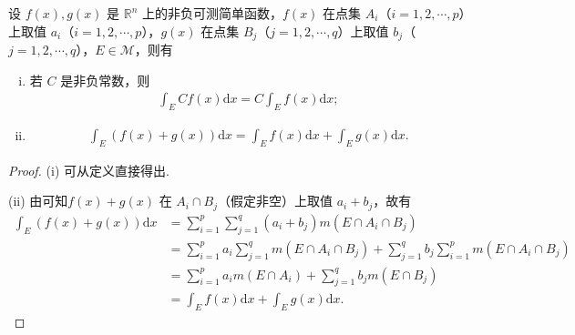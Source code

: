 \documentclass[../../main.tex]{subfiles}%
\begin{document}
\begin{theorem}[积分的线性性质]\label{theorem:简单函数积分的线性性质}
设 \(f(x),g(x)\) 是 \(\mathbb{R}^n\) 上的非负可测简单函数，\(f(x)\) 在点集 \(A_i\)（\(i = 1,2,\cdots,p\)）上取值 \(a_i\)（\(i = 1,2,\cdots,p\)），\(g(x)\) 在点集 \(B_j\)（\(j = 1,2,\cdots,q\)）上取值 \(b_j\)（\(j = 1,2,\cdots,q\)），\(E\in\mathscr{M}\)，则有
\begin{enumerate}[(i)]
\item 若 \(C\) 是非负常数，则
\begin{align*}
\int_{E}Cf(x)\mathrm{d}x = C\int_{E}f(x)\mathrm{d}x;
\end{align*}
\item 
\begin{align*}
\int_{E}(f(x)+g(x))\mathrm{d}x=\int_{E}f(x)\mathrm{d}x+\int_{E}g(x)\mathrm{d}x.
\end{align*}
\end{enumerate}
\end{theorem}
\begin{proof}

(i) 可从定义直接得出.

(ii) 由可知\(f(x)+g(x)\) 在 \(A_i\cap B_j\)（假定非空）上取值 \(a_i + b_j\)，故有
\begin{align*}
\int_{E}(f(x)+g(x))\mathrm{d}x&=\sum_{i = 1}^{p}\sum_{j = 1}^{q}(a_i + b_j)m(E\cap A_i\cap B_j)\\
&=\sum_{i = 1}^{p}a_i\sum_{j = 1}^{q}m(E\cap A_i\cap B_j)+\sum_{j = 1}^{q}b_j\sum_{i = 1}^{p}m(E\cap A_i\cap B_j)\\
&=\sum_{i = 1}^{p}a_im(E\cap A_i)+\sum_{j = 1}^{q}b_jm(E\cap B_j)\\
&=\int_{E}f(x)\mathrm{d}x+\int_{E}g(x)\mathrm{d}x.
\end{align*} 

\end{proof}
\end{document}
